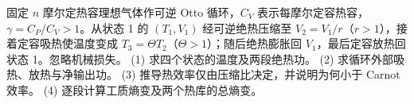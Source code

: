 固定 \(n\) 摩尔定热容理想气体作可逆 Otto 循环，\(C_V\) 表示每摩尔定容热容，\(\gamma=C_P/C_V>1\)。从状态 1 的 \((T_1,V_1)\) 经可逆绝热压缩至 \(V_2=V_1/r\)（\(r>1\)），接着定容吸热使温度变成 \(T_3=\Theta T_2\)（\(\Theta>1\)）；随后绝热膨胀回 \(V_1\)，最后定容放热回状态 1。忽略机械损失。
(1) 求四个状态的温度及两段绝热功。
(2) 求循环外部吸热、放热与净输出功。
(3) 推导热效率仅由压缩比决定，并说明为何小于 Carnot 效率。
(4) 逐段计算工质熵变及两个热库的总熵变。
